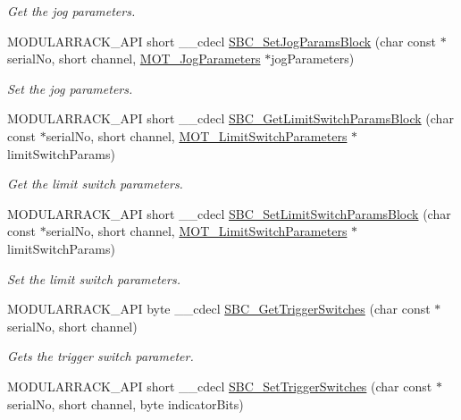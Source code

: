 \begin{DoxyCompactItemize}
\begin{DoxyCompactList}\small\item\em Get the jog parameters. \end{DoxyCompactList}\item 
M\+O\+D\+U\+L\+A\+R\+R\+A\+C\+K\+\_\+\+A\+PI short \+\_\+\+\_\+cdecl \hyperlink{group___modular_stepper_gaec1871d4ee992f7aa6ce62e4c52925ba}{S\+B\+C\+\_\+\+Set\+Jog\+Params\+Block} (char const $\ast$serial\+No, short channel, \hyperlink{struct_m_o_t___jog_parameters}{M\+O\+T\+\_\+\+Jog\+Parameters} $\ast$jog\+Parameters)
\begin{DoxyCompactList}\small\item\em Set the jog parameters. \end{DoxyCompactList}\item 
M\+O\+D\+U\+L\+A\+R\+R\+A\+C\+K\+\_\+\+A\+PI short \+\_\+\+\_\+cdecl \hyperlink{group___modular_stepper_ga876693ca2cb3ee96356b8bd70009ac83}{S\+B\+C\+\_\+\+Get\+Limit\+Switch\+Params\+Block} (char const $\ast$serial\+No, short channel, \hyperlink{struct_m_o_t___limit_switch_parameters}{M\+O\+T\+\_\+\+Limit\+Switch\+Parameters} $\ast$limit\+Switch\+Params)
\begin{DoxyCompactList}\small\item\em Get the limit switch parameters. \end{DoxyCompactList}\item 
M\+O\+D\+U\+L\+A\+R\+R\+A\+C\+K\+\_\+\+A\+PI short \+\_\+\+\_\+cdecl \hyperlink{group___modular_stepper_ga09ce40268cebd7ab5f07c3cd5e470eca}{S\+B\+C\+\_\+\+Set\+Limit\+Switch\+Params\+Block} (char const $\ast$serial\+No, short channel, \hyperlink{struct_m_o_t___limit_switch_parameters}{M\+O\+T\+\_\+\+Limit\+Switch\+Parameters} $\ast$limit\+Switch\+Params)
\begin{DoxyCompactList}\small\item\em Set the limit switch parameters. \end{DoxyCompactList}\item 
M\+O\+D\+U\+L\+A\+R\+R\+A\+C\+K\+\_\+\+A\+PI byte \+\_\+\+\_\+cdecl \hyperlink{group___modular_stepper_ga8e347d68b26a2496fd0e4cb78bdcc79e}{S\+B\+C\+\_\+\+Get\+Trigger\+Switches} (char const $\ast$serial\+No, short channel)
\begin{DoxyCompactList}\small\item\em Gets the trigger switch parameter. \end{DoxyCompactList}\item 
M\+O\+D\+U\+L\+A\+R\+R\+A\+C\+K\+\_\+\+A\+PI short \+\_\+\+\_\+cdecl \hyperlink{group___modular_stepper_gaadb9d8718416083fb81d579984af244e}{S\+B\+C\+\_\+\+Set\+Trigger\+Switches} (char const $\ast$serial\+No, short channel, byte indicator\+Bits)

\end{DoxyCompactItemize}

